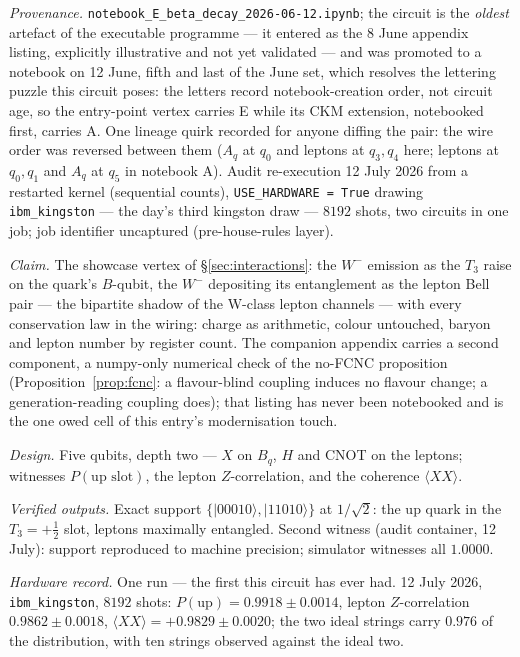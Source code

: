 \emph{Provenance.} \texttt{notebook\_E\_beta\_decay\_2026-06-12.ipynb}; the circuit is the
\emph{oldest} artefact of the executable programme --- it entered as the 8 June appendix listing,
explicitly illustrative and not yet validated --- and was promoted to a notebook on 12 June,
fifth and last of the June set, which resolves the lettering puzzle this circuit poses: the
letters record notebook-creation order, not circuit age, so the entry-point vertex carries E
while its CKM extension, notebooked first, carries A. One lineage quirk recorded for anyone
diffing the pair: the wire order was reversed between them ($A_{q}$ at $q_{0}$ and leptons at
$q_{3}, q_{4}$ here; leptons at $q_{0}, q_{1}$ and $A_{q}$ at $q_{5}$ in notebook A). Audit
re-execution 12 July 2026 from a restarted kernel (sequential counts), \texttt{USE\_HARDWARE =
True} drawing \texttt{ibm\_kingston} --- the day's third kingston draw --- $8192$ shots, two
circuits in one job; job identifier uncaptured (pre-house-rules layer).

\emph{Claim.} The showcase vertex of \S\ref{sec:interactions}: the $W^{-}$ emission as the
$T_{3}$ raise on the quark's $B$-qubit, the $W^{-}$ depositing its entanglement as the lepton
Bell pair --- the bipartite shadow of the W-class lepton channels --- with every conservation law
in the wiring: charge as arithmetic, colour untouched, baryon and lepton number by register
count. The companion appendix carries a second component, a numpy-only numerical check of the
no-FCNC proposition (Proposition~\ref{prop:fcnc}: a flavour-blind coupling induces no flavour
change; a generation-reading coupling does); that listing has never been notebooked and is the
one owed cell of this entry's modernisation touch.

\emph{Design.} Five qubits, depth two --- $X$ on $B_{q}$, $H$ and CNOT on the leptons; witnesses
$P(\text{up slot})$, the lepton $Z$-correlation, and the coherence $\langle XX\rangle$.

\emph{Verified outputs.} Exact support $\{\lvert00010\rangle, \lvert11010\rangle\}$ at
$1/\sqrt2$: the up quark in the $T_{3} = +\tfrac12$ slot, leptons maximally entangled. Second
witness (audit container, 12 July): support reproduced to machine precision; simulator witnesses
all $1.0000$.

\emph{Hardware record.} One run --- the first this circuit has ever had. 12 July 2026,
\texttt{ibm\_kingston}, $8192$ shots: $P(\text{up}) = 0.9918 \pm 0.0014$, lepton
$Z$-correlation $0.9862 \pm 0.0018$, $\langle XX\rangle = +0.9829 \pm 0.0020$; the two ideal
strings carry $0.976$ of the distribution, with ten strings observed against the ideal two.

